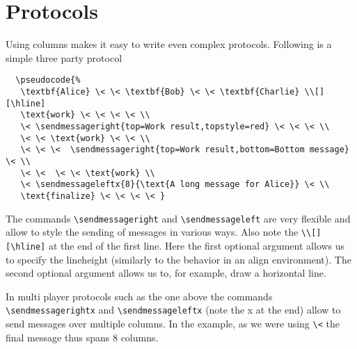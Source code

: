 \documentclass[a4paper]{report}
\begin{document}
  \section{Protocols}
  Using columns makes it easy to write even complex protocols. Following is a simple
  three party protocol
  \begin{center}
  \end{center}
  \begin{lstlisting}
  \pseudocode{%
   \textbf{Alice} \< \< \textbf{Bob} \< \< \textbf{Charlie} \\[][\hline]
   \text{work} \< \< \< \< \\
   \< \sendmessageright{top=Work result,topstyle=red} \< \< \< \\
   \< \< \text{work} \< \< \\
   \< \< \<  \sendmessageright{top=Work result,bottom=Bottom message} \< \\
   \< \<  \< \< \text{work} \\
   \< \sendmessageleftx{8}{\text{A long message for Alice}} \< \\
   \text{finalize} \< \< \< \< }
  \end{lstlisting}
  The commands \lstinline$\sendmessageright$ and \lstinline$\sendmessageleft$ are very flexible and
  allow to style the sending of messages in various ways. Also note the \lstinline$\\[][\hline]$ at the end of the
  first line. Here the first optional argument allows us to specify the lineheight (similarly to the behavior in an
  align environment). The second optional argument allows us to, for example, draw a horizontal line.
  
  In multi player protocols such as the one
  above the commands  \lstinline$\sendmessagerightx$ and \lstinline$\sendmessageleftx$ (note the x at the end)
  allow to send messages over multiple columns. In the example, as we were using \lstinline$\<$ the
  final message thus spans 8 columns. 
  
\end{document}
